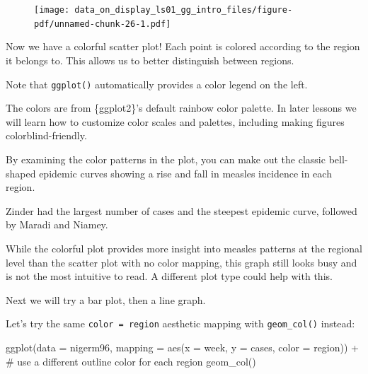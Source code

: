 \documentclass[
  letterpaper,
  DIV=11,
  numbers=noendperiod]{scrreprt}
\newenvironment{Shaded}{\begin{snugshade}}{\end{snugshade}}
\newcommand{\AttributeTok}[1]{\textcolor[rgb]{0.40,0.45,0.13}{#1}}
\newcommand{\CommentTok}[1]{\textcolor[rgb]{0.37,0.37,0.37}{#1}}
\newcommand{\FunctionTok}[1]{\textcolor[rgb]{0.28,0.35,0.67}{#1}}
\newcommand{\NormalTok}[1]{\textcolor[rgb]{0.00,0.23,0.31}{#1}}
\newcommand{\SpecialCharTok}[1]{\textcolor[rgb]{0.37,0.37,0.37}{#1}}
\begin{document}
\begin{figure}[H]

{\centering \texttt{[image: data\_on\_display\_ls01\_gg\_intro\_files/figure-pdf/unnamed-chunk-26-1.pdf]}

}

\end{figure}

Now we have a colorful scatter plot! Each point is colored according to
the region it belongs to. This allows us to better distinguish between
regions.

Note that \texttt{ggplot()} automatically provides a color legend on the
left.

\begin{tcolorbox}[enhanced jigsaw, colframe=quarto-callout-note-color-frame, colbacktitle=quarto-callout-note-color!10!white, titlerule=0mm, opacitybacktitle=0.6, breakable, toprule=.15mm, arc=.35mm, rightrule=.15mm, colback=white, bottomrule=.15mm, opacityback=0, toptitle=1mm, left=2mm, bottomtitle=1mm, title=\textcolor{quarto-callout-note-color}{\faInfo}\hspace{0.5em}{Side Note}, leftrule=.75mm, coltitle=black]

The colors are from \{ggplot2\}'s default rainbow color palette. In
later lessons we will learn how to customize color scales and palettes,
including making figures colorblind-friendly.

\end{tcolorbox}

By examining the color patterns in the plot, you can make out the
classic bell-shaped epidemic curves showing a rise and fall in measles
incidence in each region.

Zinder had the largest number of cases and the steepest epidemic curve,
followed by Maradi and Niamey.

While the colorful plot provides more insight into measles patterns at
the regional level than the scatter plot with no color mapping, this
graph still looks busy and is not the most intuitive to read. A
different plot type could help with this.

Next we will try a bar plot, then a line graph.

Let's try the same \texttt{color\ =\ region} aesthetic mapping with
\texttt{geom\_col()} instead:

\begin{Shaded}
\begin{Highlighting}[]
\FunctionTok{ggplot}\NormalTok{(}\AttributeTok{data =}\NormalTok{ nigerm96, }
       \AttributeTok{mapping =} \FunctionTok{aes}\NormalTok{(}\AttributeTok{x =}\NormalTok{ week, }
                     \AttributeTok{y =}\NormalTok{ cases, }
                     \AttributeTok{color =}\NormalTok{ region)) }\SpecialCharTok{+}  \CommentTok{\# use a different outline color for each region}
  \FunctionTok{geom\_col}\NormalTok{()}
\end{Highlighting}
\end{Shaded}
\end{document}
